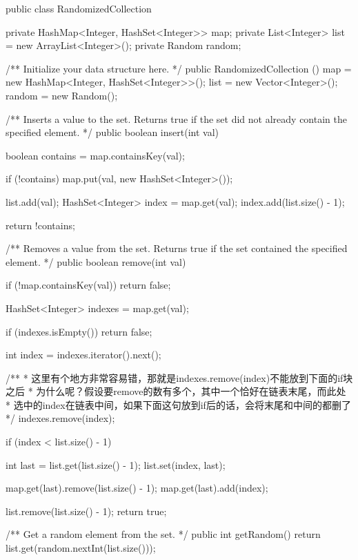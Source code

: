 \begin{Code}
public class RandomizedCollection {

    private HashMap<Integer, HashSet<Integer>> map;
    private List<Integer> list = new ArrayList<Integer>();
    private Random random;

    /** Initialize your data structure here. */
    public RandomizedCollection () {
        map = new HashMap<Integer, HashSet<Integer>>();
        list = new Vector<Integer>();
        random = new Random();
    }

    /** Inserts a value to the set. Returns true if the set did not already contain the specified element. */
    public boolean insert(int val) {
        boolean contains = map.containsKey(val);

        if (!contains) {
            map.put(val, new HashSet<Integer>());
        }

        list.add(val);
        HashSet<Integer> index = map.get(val);
        index.add(list.size() - 1);

        return !contains;
    }

    /** Removes a value from the set. Returns true if the set contained the specified element. */
    public boolean remove(int val) {
        if (!map.containsKey(val)) {
            return false;
        }

        HashSet<Integer> indexes = map.get(val);

        if (indexes.isEmpty()) {
            return false;
        }

        int index = indexes.iterator().next();

        /**
         * 这里有个地方非常容易错，那就是indexes.remove(index)不能放到下面的if块之后
         * 为什么呢？假设要remove的数有多个，其中一个恰好在链表末尾，而此处
         * 选中的index在链表中间，如果下面这句放到if后的话，会将末尾和中间的都删了
         */
        indexes.remove(index);

        if (index < list.size() - 1) {
            int last = list.get(list.size() - 1);
            list.set(index, last);

            map.get(last).remove(list.size() - 1);
            map.get(last).add(index);
        }

        list.remove(list.size() - 1);
        return true;
    }

    /** Get a random element from the set. */
    public int getRandom() {
        return list.get(random.nextInt(list.size()));
    }
}
\end{Code}

